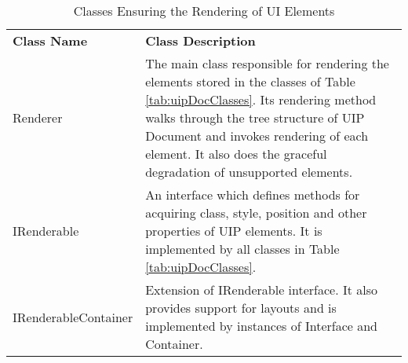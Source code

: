 \begin{table}[htbp]
  \centering
  \caption{Classes Ensuring the Rendering of UI Elements}
  \label{tab:uipRenderClasses}
 \renewcommand{\arraystretch}{1.2}
    \begin{tabularx}{\textwidth}{p{2.5cm}|X}
    \rowcolor{mygray}
    \textbf{Class Name} & \textbf{Class Description} \\
       Renderer & The main class responsible for rendering the elements stored in the classes of Table \ref{tab:uipDocClasses}. Its rendering method walks through the tree structure of UIP Document and invokes rendering of each element. It also does the graceful degradation of unsupported elements. \\ \hline
       IRenderable & An interface which defines methods for acquiring class, style, position and other properties of UIP elements. It is implemented by all classes in Table \ref{tab:uipDocClasses}. \\ \hline
       \hspace{0pt}IRenderableContainer & Extension of IRenderable interface. It also provides support for layouts and is implemented by instances of Interface and Container. \\
    \end{tabularx}%
\end{table}%